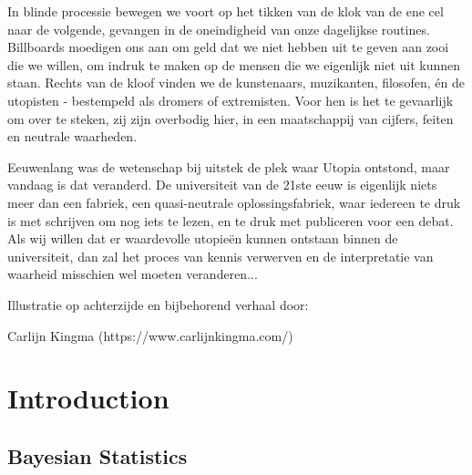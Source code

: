 \documentclass[openright,titlepage,12pt,a4paper]{book}
\begin{document}
In blinde processie bewegen we voort op het tikken van de klok van de ene cel naar de volgende, gevangen in de oneindigheid van onze dagelijkse routines. Billboards moedigen ons aan om geld dat we niet hebben uit te geven aan zooi die we willen, om indruk te maken op de mensen die we eigenlijk niet uit kunnen staan. Rechts van de kloof vinden we de kunstenaars, muzikanten, filosofen, én de utopisten - bestempeld als dromers of extremisten. Voor hen is het te gevaarlijk om over te steken, zij zijn overbodig hier, in een maatschappij van cijfers, feiten en neutrale waarheden.

Eeuwenlang was de wetenschap bij uitstek de plek waar Utopia ontstond, maar vandaag is dat veranderd. De universiteit van de 21ste eeuw is eigenlijk niets meer dan een fabriek, een quasi-neutrale oplossingsfabriek, waar iedereen te druk is met schrijven om nog iets te lezen, en te druk met publiceren voor een debat. Als wij willen dat er waardevolle utopieën kunnen ontstaan binnen de universiteit, dan zal het proces van kennis verwerven en de interpretatie van waarheid misschien wel moeten veranderen...

\vspace*{\fill}

Illustratie op achterzijde en bijbehorend verhaal door:

Carlijn Kingma (https://www.carlijnkingma.com/)

\newpage


% 

\setcounter{tocdepth}{1}
\tableofcontents
\thispagestyle{empty}

\mainmatter

\pagestyle{headings}

\renewcommand{\chaptername}{}

\hypertarget{introduction}{%
\chapter{Introduction}\label{introduction}}

\thispagestyle{empty}

\hypertarget{bayesian-statistics}{%
\section{Bayesian Statistics}\label{bayesian-statistics}}
\end{document}
